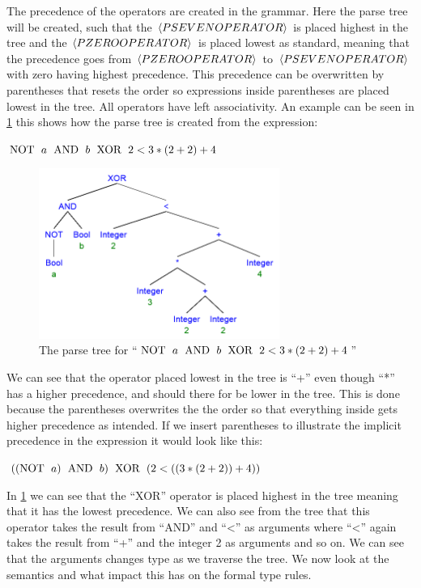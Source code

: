 The precedence of the operators are created in the grammar. Here the parse tree will be created, such that the $\braket{PSEVENOPERATOR}$ is placed highest in the tree and the $\braket{PZEROOPERATOR}$ is placed lowest as standard, meaning that the precedence goes from $\braket{PZEROOPERATOR}$ to $\braket{PSEVENOPERATOR}$ with zero having highest precedence. This precedence can be overwritten by parentheses that resets the order so expressions inside parentheses are placed lowest in the tree. All operators have left associativity. An example can be seen in \cref{precedenceExamples} this shows how the parse tree is created from the expression: \\
\begin{center}
$\text{NOT \;} a \text{\; AND \;} b \text{\; XOR \;} 2 < 3 * (2 + 2) + 4$
\end{center}

\begin{figure}[h]
\centering
\includegraphics[width=0.7\textwidth]{Design/Expressions/precidenceExamples.png}
\caption{The parse tree for \textnormal{\enquote{$\text{NOT \;} a \text{\; AND \;} b \text{\; XOR \;} 2 < 3 * (2 + 2) + 4$}}} %
\label{precedenceExamples}
\end{figure}

We can see that the operator placed lowest in the tree is \enquote{+} even though \enquote{*} has a higher precedence, and should there for be lower in the tree. This is done because the parentheses overwrites the the order so that everything inside gets higher precedence as intended. If we insert parentheses to illustrate the implicit precedence in the expression it would look like this:
\begin{center}
$((\text{NOT \;} a) \text{\; AND \;} b) \text{\; XOR \;} (2 < ((3 * (2 + 2)) + 4))$
\end{center}
In \cref{precedenceExamples} we can see that the \enquote{XOR} operator is placed highest in the tree meaning that it has the lowest precedence. We can also see from the tree that this operator takes the result from \enquote{AND} and \enquote{<} as arguments where \enquote{<} again takes the result from \enquote{+} and the integer 2 as arguments and so on. We can see that the arguments changes type as we traverse the tree. We now look at the semantics and what impact this has on the formal type rules.

